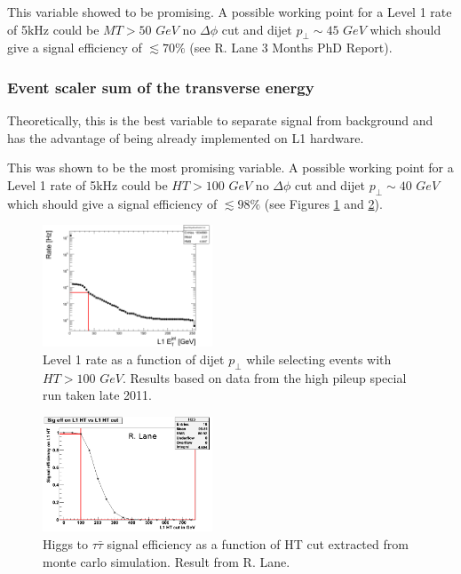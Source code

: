 \documentclass[%
reprint,
amsmath,
amssymb,
aps,
pra,
showkeys
]{revtex4-1}
\begin{document}
This variable showed to be promising. A possible working point for a Level 1 rate
of 5kHz could be $MT>50$ $GeV$ no $\Delta\phi$ cut and dijet $p_\bot \sim 45$ $GeV$ which should give a signal
efficiency of $\lesssim70\%$ (see R. Lane 3 Months PhD Report).

\subsubsection{Event scaler sum of the transverse energy}

Theoretically, this is the best variable to separate signal from background and has the advantage of being already
implemented on L1 hardware.

This was shown to be the most promising variable. A possible working point for a Level 1 rate of 5kHz could be $HT>100$ 
$GeV$ no $\Delta\phi$ cut and dijet $p_\bot \sim 40$ $GeV$ which should give a signal efficiency of $\lesssim98\%$
(see Figures \ref{figure_PU28_5e33_RateFBDijetDEtaDPhi00HT100} and \ref{figure_sig_eff_l1_ht}).

\begin{figure}[ht]
\centering
\includegraphics[width=0.45\textwidth]{img/PU28_5e33_RateFBDijetDEtaDPhi00HT100.png}
\caption{Level 1 rate as a function of dijet $p_\bot$ while selecting events with $HT>100$ $GeV$. Results based on
data from the high pileup special run taken late 2011.}
\label{figure_PU28_5e33_RateFBDijetDEtaDPhi00HT100}
\end{figure}

\begin{figure}[ht]
\centering
\includegraphics[width=0.45\textwidth]{img/sig_eff_l1_ht.png}
\caption{Higgs to $\tau\bar{\tau}$ signal efficiency as a function of HT cut extracted from monte carlo simulation.
Result from R. Lane.}
\label{figure_sig_eff_l1_ht}
\end{figure}
\end{document}
